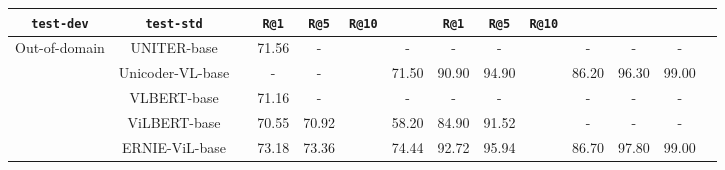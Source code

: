 \documentclass[letterpaper]{article} \usepackage{aaai21}  \usepackage{times}  \usepackage{helvet} \usepackage{courier}  \usepackage[hyphens]{url}  \usepackage{graphicx} \urlstyle{rm} \def\UrlFont{\rm}  \usepackage{natbib}  \usepackage{caption} \frenchspacing  \setlength{\pdfpagewidth}{8.5in}  \setlength{\pdfpageheight}{11in}  \usepackage{cite}
\begin{document}
\begin{table*}[t]
\begin{tabular}{llllllllllllll}
 \multicolumn{1}{c}{\texttt{test-dev}} & 
 \multicolumn{1}{c}{\texttt{test-std}} & 
 \multicolumn{1}{c}{} & 
 \multicolumn{1}{c}{\texttt{R@1}} &
 \multicolumn{1}{c}{\texttt{R@5}} & \multicolumn{1}{c}{\texttt{R@10}} &
 \multicolumn{1}{c}{} & 
 \multicolumn{1}{c}{\texttt{R@1}} &
 \multicolumn{1}{c}{\texttt{R@5}} & \multicolumn{1}{c}{\texttt{R@10}} \\
\hline

\multirow{7}{*}{Out-of-domain} & \multicolumn{1}{c}{UNITER-base} & \multicolumn{1}{c}{} & \multicolumn{1}{c}{71.56} & \multicolumn{1}{c}{-} & \multicolumn{1}{c}{} & \multicolumn{1}{c}{-} & \multicolumn{1}{c}{-} & \multicolumn{1}{c}{-} &
\multicolumn{1}{c}{} &
\multicolumn{1}{c}{-} & \multicolumn{1}{c}{-} & 
\multicolumn{1}{c}{-} \\

& \multicolumn{1}{c}{Unicoder-VL-base} & \multicolumn{1}{c}{} & \multicolumn{1}{c}{-} & \multicolumn{1}{c}{-} & \multicolumn{1}{c}{} & \multicolumn{1}{c}{71.50} & \multicolumn{1}{c}{90.90} & \multicolumn{1}{c}{94.90} & \multicolumn{1}{c}{} &
 \multicolumn{1}{c}{86.20} & \multicolumn{1}{c}{96.30} & \multicolumn{1}{c}{99.00} \\

& \multicolumn{1}{c}{VLBERT-base} & \multicolumn{1}{c}{} & \multicolumn{1}{c}{71.16} & \multicolumn{1}{c}{-} & \multicolumn{1}{c}{} & \multicolumn{1}{c}{-} & \multicolumn{1}{c}{-} & \multicolumn{1}{c}{-} & \multicolumn{1}{c}{} &
 \multicolumn{1}{c}{-} & \multicolumn{1}{c}{-} & \multicolumn{1}{c}{-} \\ 

& \multicolumn{1}{c}{ViLBERT-base} & \multicolumn{1}{c}{} & \multicolumn{1}{c}{70.55} & \multicolumn{1}{c}{70.92} & \multicolumn{1}{c}{} & \multicolumn{1}{c}{58.20} & \multicolumn{1}{c}{84.90} & \multicolumn{1}{c}{91.52} & \multicolumn{1}{c}{} &
 \multicolumn{1}{c}{-} & \multicolumn{1}{c}{-} & \multicolumn{1}{c}{-} \\
 
& \multicolumn{1}{c}{ERNIE-ViL-base} & \multicolumn{1}{c}{} & \multicolumn{1}{c}{73.18} & \multicolumn{1}{c}{73.36} & \multicolumn{1}{c}{} & \multicolumn{1}{c}{74.44} & \multicolumn{1}{c}{92.72} & \multicolumn{1}{c}{95.94} & \multicolumn{1}{c}{} &
 \multicolumn{1}{c}{86.70} & \multicolumn{1}{c}{97.80} & \multicolumn{1}{c}{99.00} \\ 


\end{tabular}
\end{table*}
\end{document}
